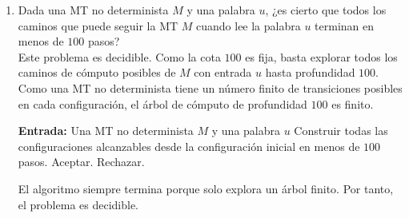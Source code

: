 \documentclass[12pt]{article}
\begin{document}
\begin{ejercicio}[2.4 puntos]
\begin{enumerate}
            Si $N$ no para con entrada $w$, entonces $M'$ siempre para rápidamente, luego sí tiene complejidad temporal $n^3$. \\

            Si $N$ para con entrada $w$ en $T$ pasos, entonces para toda entrada $x$ con $|x|\geq T$, la máquina $M'$ detecta la parada de $N(w)$ y 
            ejecuta $|x|^4$ pasos. Por tanto, $M'$ no tiene complejidad temporal $n^3$. \\

            Así,
            $$
            \langle N,w\rangle\in \text{PARADA}
            \Longleftrightarrow
            \langle M'\rangle\in P_3.
            $$
            Por tanto, $\text{PARADA}\propto P_3$. Si $P_3$ fuera decidible, también lo sería PARADA, contradicción. Luego $P_3$ no es decidible. \\

            En conclusión, el problema es semidecidible pero no decidible.
            
            \newpage

            \item Dada una MT no determinista $M$ y una palabra $u$, ¿es cierto que todos los caminos que puede seguir la MT $M$ cuando lee la palabra $u$ terminan en menos de $100$ pasos? \\
            
            Este problema es decidible. Como la cota $100$ es fija, basta explorar todos los caminos de cómputo posibles de $M$ con entrada $u$ hasta profundidad $100$. Como una MT no determinista tiene un número finito de transiciones posibles en cada configuración, el árbol de cómputo de profundidad $100$ es finito.

            \begin{algorithm}
            \caption{Decisor}
            \begin{algorithmic}
            \State \textbf{Entrada:} Una MT no determinista $M$ y una palabra $u$
            \State Construir todas las configuraciones alcanzables desde la configuración inicial en menos de $100$ pasos.
                \State Aceptar.
            \Else
                \State Rechazar.
            \EndIf
            \end{algorithmic}
            \end{algorithm}

            El algoritmo siempre termina porque solo explora un árbol finito. Por tanto, el problema es decidible.

        \end{enumerate}
    \end{ejercicio}
\end{document}
